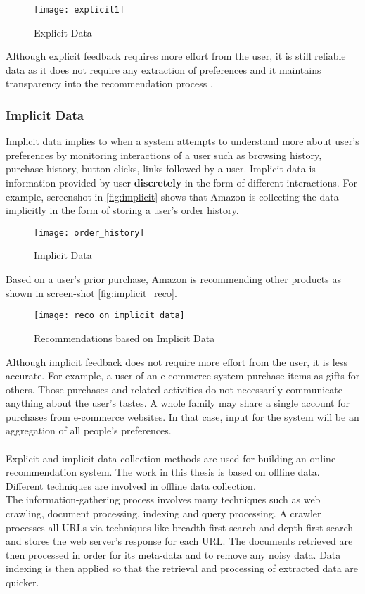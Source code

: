 \begin{figure}[H]
	\centering
	\texttt{[image: explicit1]}
	\caption{Explicit Data \cite{36}}
	\label{fig:explicit}
\end{figure}

\noindent Although explicit feedback requires more effort from the user, it is still reliable data as it does not require any extraction of preferences and it maintains transparency into the recommendation process \cite{35}.

\subsubsection{Implicit Data}

Implicit data implies to when a system attempts to understand more about user's preferences by monitoring interactions of a user such as browsing history, purchase history, button-clicks, links followed by a user. Implicit data is information provided by user \textbf{discretely} in the form of different interactions. For example, screenshot in \autoref{fig:implicit} shows that Amazon is collecting the data implicitly in the form of storing a user's order history.
\begin{figure}[H]
	\centering
	\texttt{[image: order\_history]}
	\caption{Implicit Data}
	\label{fig:implicit}
\end{figure}

\noindent Based on a user's prior purchase, Amazon is recommending other products as shown in screen-shot \autoref{fig:implicit_reco}.

\begin{figure}[H]
	\centering
	\texttt{[image: reco\_on\_implicit\_data]}
	\caption{Recommendations based on Implicit Data}
	\label{fig:implicit_reco}
\end{figure}


\noindent Although implicit feedback does not require more effort from the user, it is less accurate. For example, a user of an e-commerce system purchase items as gifts for others. Those purchases and related activities do not necessarily communicate anything about the user’s tastes. A whole family may share a single account for purchases from e-commerce websites. In that case, input for the system will be an aggregation of all people's preferences.
\\
\\
Explicit and implicit data collection methods are used for building an online recommendation system. The work in this thesis is based on offline data. Different techniques are involved in offline data collection. \\
The information-gathering process involves many techniques such as web crawling, document processing, indexing and query processing. A crawler processes all URLs via techniques like breadth-first search and depth-first search and stores the web server's response for each URL. The documents retrieved are then processed in order for its meta-data and to remove any noisy data. Data indexing is then applied so that the retrieval and processing of extracted data are quicker.


